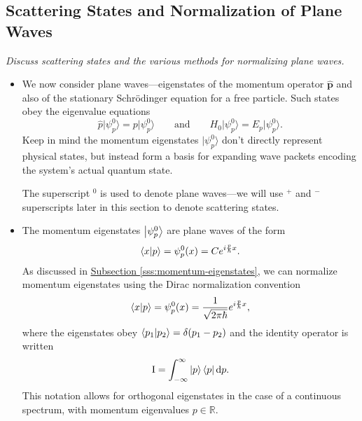 \documentclass[11pt, a4paper]{article}
\newcommand{\diff}{\mathop{}\!\mathrm{d}} %
\newcommand{\Schro}{Schr\"{o}dinger\xspace}
\renewcommand{\vec}[1]{\bm{#1}}  %
\newcommand{\II}{\operatorname{I}}  %
\newcommand{\bket}[1]{\big | {#1} \big \rangle }
\begin{document}
\subsection{Scattering States and Normalization of Plane Waves}
\textit{Discuss scattering states and the various methods for normalizing plane waves.}
\begin{itemize}
    \item We now consider plane waves---eigenstates of the momentum operator $ \hat{\vec{p}} $ and also of the stationary \Schro equation for a free particle. Such states obey the eigenvalue equations
    \begin{equation*}
        \hat{p} \bket{\psi_{p}^{0}} = p\bket{\psi_{p}^{0}} \qquad \text{and} \qquad H_{0} \bket{\psi_{p}^{0}} = E_{p}\bket{\psi_{p}^{0}}.
    \end{equation*}
    Keep in mind the momentum eigenstates $ \bket{\psi_{p}^{0}} $ don't directly represent physical states, but instead form a basis for expanding wave packets encoding the system's actual quantum state.
    
    The superscript $ {}^{0} $ is used to denote plane waves---we will use $ {}^{+} $ and $ {}^{-} $ superscripts later in this section to denote scattering states.

    \item The momentum eigenstates $ \ket{\psi_{p}^{0}} $ are plane waves of the form
    \begin{equation*}
        \braket{x}{p} = \psi_{p}^{0}(x) = Ce^{i \frac{p}{\hbar}x}.
    \end{equation*}
    As discussed in \hyperref[sss:momentum-eigenstates]{\underline{Subsection \ref{sss:momentum-eigenstates}}}, we can normalize momentum eigenstates using the Dirac normalization convention
    \begin{equation*}
        \braket{x}{p} = \psi_{p}^{0}(x) = \frac{1}{\sqrt{2\pi \hbar}} e^{i \frac{p}{\hbar}x},
    \end{equation*}
    where the eigenstates obey $ \braket{p_{1}}{p_{2}} = \delta(p_{1} - p_{2}) $ and the identity operator is written
    \begin{equation*}
        \II = \int_{-\infty}^{\infty} \ket{p} \bra{p} \diff p.
    \end{equation*}
    This notation allows for orthogonal eigenstates in the case of a continuous spectrum, with momentum eigenvalues $ p \in \mathbb{R} $. 


\end{itemize}
\end{document}
